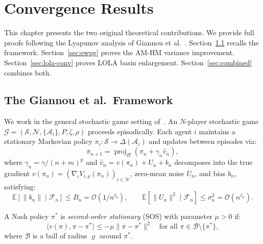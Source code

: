 \chapter{Convergence Results}
\label{ch:results}

This chapter presents the two original theoretical contributions. We provide full proofs following the Lyapunov analysis of Giannou et al.~\cite{giannou2022}. Section~\ref{sec:giannou-recap} recalls the framework. Section~\ref{sec:ewpg} proves the AM-HM variance improvement. Section~\ref{sec:lola-conv} proves LOLA basin enlargement. Section~\ref{sec:combined} combines both.


\section{The Giannou et al.\ Framework}
\label{sec:giannou-recap}

We work in the general stochastic game setting of~\cite{giannou2022}. An $N$-player stochastic game $\mathcal{G} = (\mathcal{S}, \mathcal{N}, \{\mathcal{A}_i\}, P, \zeta, \rho)$ proceeds episodically. Each agent $i$ maintains a stationary Markovian policy $\pi_i: \mathcal{S} \to \Delta(\mathcal{A}_i)$ and updates between episodes via:
\begin{equation}
\label{eq:pg-ch3}
\tag{PG}
    \pi_{n+1} = \operatorname{proj}_\Pi(\pi_n + \gamma_n \hat{v}_n),
\end{equation}
where $\gamma_n = \gamma/(n+m)^p$ and $\hat{v}_n = v(\pi_n) + U_n + b_n$ decomposes into the true gradient $v(\pi_n) = (\nabla_i V_{i,\rho}(\pi_n))_{i \in \mathcal{N}}$, zero-mean noise $U_n$, and bias $b_n$, satisfying:
\begin{equation}
\label{eq:bias-var-ch3}
    \mathbb{E}[\|b_n\| \mid \mathcal{F}_n] \leq B_n = \mathcal{O}(1/n^{\ell_b}), \qquad \mathbb{E}[\|U_n\|^2 \mid \mathcal{F}_n] \leq \sigma_n^2 = \mathcal{O}(n^{\ell_\sigma}).
\end{equation}

A Nash policy $\pi^*$ is \emph{second-order stationary} (SOS) with parameter $\mu > 0$ if:
\begin{equation}
\label{eq:sos-ch3}
\tag{SOS}
    \langle v(\pi), \pi - \pi^* \rangle \leq -\mu \|\pi - \pi^*\|^2 \quad \text{for all } \pi \in \mathcal{B} \setminus \{\pi^*\},
\end{equation}
where $\mathcal{B}$ is a ball of radius $\varrho$ around $\pi^*$.

